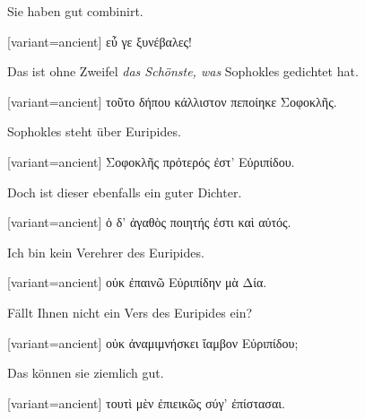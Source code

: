Sie haben gut combinirt. 

\switchcolumn

\begin{greek}[variant=ancient]%
εὖ γε ξυνέβαλες!

\end{greek}%
\switchcolumn*

Das ist ohne Zweifel \emph{das Schönste, was} Sophokles gedichtet
hat. 

\switchcolumn

\begin{greek}[variant=ancient]%
τοῦτο δήπου κάλλιστον πεποίηκε Σοφοκλῆς.

\end{greek}%
\switchcolumn*

Sophokles steht über Euripides. 

\switchcolumn

\begin{greek}[variant=ancient]%
Σοφοκλῆς πρότερός ἐστ' Εὐριπίδου.

\end{greek}%
\switchcolumn*

Doch ist dieser ebenfalls ein guter Dichter. 

\switchcolumn

\begin{greek}[variant=ancient]%
ὁ δ' ἀγαθὸς ποιητής ἐστι καὶ αὐτός.

\end{greek}%
\switchcolumn*

Ich bin kein Verehrer des Euripides. 

\switchcolumn

\begin{greek}[variant=ancient]%
οὐκ ἐπαινῶ Εὐριπίδην μὰ Δία.

\end{greek}%
\switchcolumn*

Fällt Ihnen nicht ein Vers des Euripides ein? 

\switchcolumn

\begin{greek}[variant=ancient]%
οὐκ ἀναμιμνήσκει ἴαμβον Εὐριπίδου;

\end{greek}%
\switchcolumn*

Das können sie ziemlich gut. 

\switchcolumn

\begin{greek}[variant=ancient]%
τουτὶ μὲν ἐπιεικῶς σύγ' ἐπίστασαι.

\end{greek}%
\switchcolumn*

